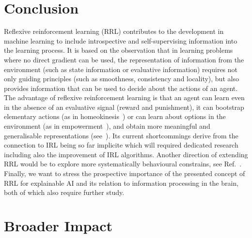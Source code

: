 \documentclass{article}
\begin{document}

\section{Conclusion}

Reflexive reinforcement learning (RRL) contributes to the development in machine learning
to include introspective and self-supervising information into the learning process. 
It is based on the observation that in learning problems where no direct gradient can be used, the representation of information from the environment (such as state information or evaluative information) requires not only guiding principles (such as smoothness, consistency and locality), but also provides information that can be used to decide about the actions of an agent.
The advantage of reflexive reinforcement learning is that an agent can learn 
even in the absence of an evaluative signal (reward and punishment), it can 
bootstrap elementary actions (as in homeokinesis~\citep{der2012playful}) or can learn about options in the environment (as in empowerment~\citep{klyubin2005empowerment}),
and obtain more meaningful and generalisable representations (see~\citep{smith2018evaluation}).
Its current shortcommings derive from the connection to IRL being so far implicite which will required dedicated research including also the improvement of IRL algorithms. Another direction of extending RRL would be to explore more systematically behavioural constrains, see 
Ref.~\cite{balakrishnan2019incorporating}.
Finally, we want to stress the prospective importance of the presented concept of RRL for 
explainable AI and its relation to information processing in the brain, both of which also require
further study.

\section*{Broader Impact}
\end{document}
